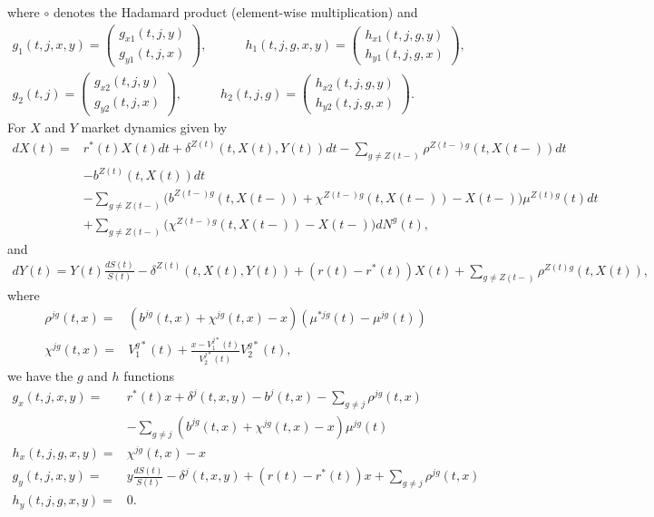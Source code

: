\documentclass[12pt]{article}
\begin{document}
where $\circ$ denotes the Hadamard product (element-wise multiplication) and
\begin{gather*}
g_1(t,j,x,y)=\begin{pmatrix}
g_{x1}(t,j,y) \\
g_{y1}(t,j,x)
\end{pmatrix},
\qquad 
\quad
h_1(t,j,g,x,y)=\begin{pmatrix}
h_{x1}(t,j,g,y) \\
h_{y1}(t,j,g,x)
\end{pmatrix},
\\
g_2(t,j)=\begin{pmatrix}
g_{x2}(t,j,y) \\
g_{y2}(t,j,x)
\end{pmatrix},
\qquad 
\quad
h_2(t,j,g)=\begin{pmatrix}
h_{x2}(t,j,g,y) \\
h_{y2}(t,j,g,x)
\end{pmatrix}.
\end{gather*}
For $X$ and $Y$ market dynamics given by
\begin{align*}
dX(t)=&
r^*(t)X(t)dt
 +\delta^{Z(t)}(t,X(t),Y(t))  dt- \sum_{g \neq Z(t-)} \rho^{Z(t-)g}(t,X(t-)) dt
 \nonumber 
\\
\nonumber
&- b^{Z(t)}(t,X(t)) dt
\\
&- \sum_{g\neq Z(t-)}\bigg(b^{Z(t-)g}(t,X(t-))+\chi^{Z(t-)g}(t,X(t-))-X(t-) \bigg) \mu^{Z(t)g}(t)dt
\\
&+ \sum_{g\neq Z(t-)}\bigg(\chi^{Z(t-)g}(t,X(t-))-X(t-) \bigg)  dN^g(t),
\end{align*}
and
\begin{align*}
dY(t)=Y(t)\frac{dS(t)}{S(t)}-\delta^{Z(t)}(t,X(t),Y(t)) + (r(t)-r^*(t)) X(t) + \sum_{g \neq Z(t-)} \rho^{Z(t)g}(t,X(t)),
\end{align*}
where
\begin{align*}
\rho^{jg}(t,x)=&(b^{jg}(t,x)+ \chi^{jg}(t,x)-x) (\mu^{*jg}(t)-\mu^{jg}(t))
\\
\chi^{jg}(t,x)=& V^{g*}_1(t) + \frac{x-V^{j*}_1(t)}{V^{j*}_2(t)}V^{g*}_2(t),
\end{align*}
we have the $g$ and $h$ functions
\begin{align*}
g_x(t,j,x,y)=&r^*(t) x + \delta^j(t,x,y)-b^j(t,x)-\sum_{g \neq j} \rho^{jg}(t,x)
\\
&-\sum_{g \neq j} \left( b^{jg}(t,x)+\chi^{jg}(t,x)-x \right) \mu^{jg}(t)
\\
h_x(t,j,g,x,y)=& \chi^{jg}(t,x)-x
\\
g_y(t,j,x,y)=& y \frac{dS(t)}{S(t)} - \delta^j(t,x,y) + (r(t)-r^*(t)) x + \sum_{g \neq j} \rho^{jg}(t,x) 
\\
h_y(t,j,g,x,y)=& 0.
\end{align*}
\end{document}

